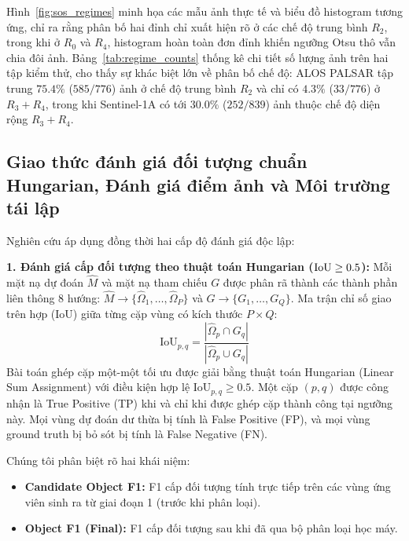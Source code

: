 Hình~\ref{fig:sos_regimes} minh họa các mẫu ảnh thực tế và biểu đồ histogram tương ứng, chỉ ra rằng phân bố hai đỉnh chỉ xuất hiện rõ ở các chế độ trung bình $R_2$, trong khi ở $R_0$ và $R_4$, histogram hoàn toàn đơn đỉnh khiến ngưỡng Otsu thô vẫn chia đôi ảnh. Bảng~\ref{tab:regime_counts} thống kê chi tiết số lượng ảnh trên hai tập kiểm thử, cho thấy sự khác biệt lớn về phân bố chế độ: ALOS PALSAR tập trung $75.4\%$ ($585/776$) ảnh ở chế độ trung bình $R_2$ và chỉ có $4.3\%$ ($33/776$) ở $R_3+R_4$, trong khi Sentinel-1A có tới $30.0\%$ ($252/839$) ảnh thuộc chế độ diện rộng $R_3+R_4$.

\subsection{Giao thức đánh giá đối tượng chuẩn Hungarian, Đánh giá điểm ảnh và Môi trường tái lập}
\label{subsec:metrics}
Nghiên cứu áp dụng đồng thời hai cấp độ đánh giá độc lập:

\noindent\textbf{1. Đánh giá cấp đối tượng theo thuật toán Hungarian ($\mathrm{IoU} \ge 0.5$):}
Mỗi mặt nạ dự đoán $\hat{M}$ và mặt nạ tham chiếu $G$ được phân rã thành các thành phần liên thông 8 hướng: $\hat{M} \to \{\hat{\Omega}_1, \dots, \hat{\Omega}_P\}$ và $G \to \{G_1, \dots, G_Q\}$. Ma trận chỉ số giao trên hợp (IoU) giữa từng cặp vùng có kích thước $P \times Q$:
\begin{equation}
\mathrm{IoU}_{p, q} = \frac{|\hat{\Omega}_p \cap G_q|}{|\hat{\Omega}_p \cup G_q|}
\end{equation}
Bài toán ghép cặp một-một tối ưu được giải bằng thuật toán Hungarian (Linear Sum Assignment) với điều kiện hợp lệ $\mathrm{IoU}_{p, q} \ge 0.5$. Một cặp $(p, q)$ được công nhận là True Positive (TP) khi và chỉ khi được ghép cặp thành công tại ngưỡng này. Mọi vùng dự đoán dư thừa bị tính là False Positive (FP), và mọi vùng ground truth bị bỏ sót bị tính là False Negative (FN).

Chúng tôi phân biệt rõ hai khái niệm:
\begin{itemize}
    \item \textbf{Candidate Object F1:} F1 cấp đối tượng tính trực tiếp trên các vùng ứng viên sinh ra từ giai đoạn 1 (trước khi phân loại).
    \item \textbf{Object F1 (Final):} F1 cấp đối tượng sau khi đã qua bộ phân loại học máy.
\end{itemize}

